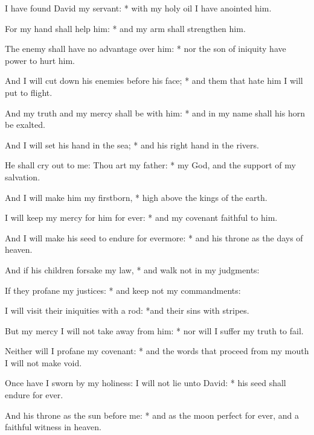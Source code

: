 \item I have found David my servant: * with my holy oil I have anointed him.
\item For my hand shall help him: * and my arm shall strengthen him.
\item The enemy shall have no advantage over him: * nor the son of iniquity have power to hurt him.
\item And I will cut down his enemies before his face; * and them that hate him I will put to flight.
\item And my truth and my mercy shall be with him: * and in my name shall his horn be exalted.
\item And I will set his hand in the sea; * and his right hand in the rivers.
\item He shall cry out to me: Thou art my father: * my God, and the support of my salvation.
\item And I will make him my firstborn, * high above the kings of the earth.
\item I will keep my mercy for him for ever: * and my covenant faithful to him.
\item And I will make his seed to endure for evermore: * and his throne as the days of heaven.
\item And if his children forsake my law, * and walk not in my judgments: 
\item If they profane my justices: * and keep not my commandments:
\item I will visit their iniquities with a rod: *and their sins with stripes. 
\item But my mercy I will not take away from him: * nor will I suffer my truth to fail.
\item Neither will I profane my covenant: * and the words that proceed from my mouth I will not make void.
\item Once have I sworn by my holiness: I will not lie unto David: * his seed shall endure for ever.
\item And his throne as the sun before me: * and as the moon perfect for ever, and a faithful witness in heaven.